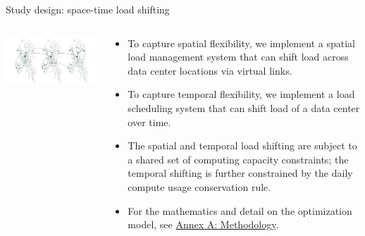 \begin{frame}{Study design: space-time load shifting}

  {\footnotesize
  \begin{columns}[T]
  
  \hspace{-1.5cm}
  \begin{column}{10cm}
  \vspace{0.3cm}
  \includegraphics[width=11.5cm]{images/spatial-temporal-vlinks.png}
  \end{column}

  \begin{column}{6cm}
  \begin{itemize}
    \vspace{0.1cm}
    \item To capture spatial flexibility, we implement a spatial load management system that can shift load across data center locations via virtual links.
    \item To capture temporal flexibility, we implement a load scheduling system that can shift load of a data center over time.
    \item The spatial and temporal load shifting are subject to a shared set of computing capacity constraints; the temporal shifting is further constrained by the daily compute usage conservation rule.
    \item For the mathematics and detail on the optimization model, see \alert{\hyperlink{methodology}{Annex A: Methodology}}.
  \end{itemize}

  \end{column}
  \end{columns}
  }
\end{frame}


